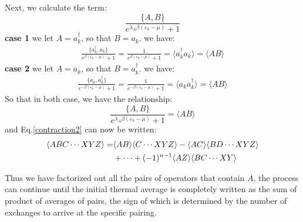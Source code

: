 \documentclass{article}
\begin{document}
Next, we calculate the term:
\begin{equation}
    \frac{\{A,B\}}{e^{\lambda_A \beta (\varepsilon_k - \mu)} + 1}
\end{equation}
\textbf{case 1} we let $A = a_k^{\dagger}$, so that $B = a_k$. we have:
\begin{align}
    \frac{\{a_k^{\dagger},a_k\}}{e^{ \beta (\varepsilon_k - \mu)} + 1} = \frac{1}{e^{\beta (\varepsilon_k - \mu)} + 1} = \langle a_k^{\dagger} a_k \rangle = \langle AB \rangle
\end{align}
\textbf{case 2} we let $A = a_k$, so that $B = a_k^{\dagger}$. we have:
\begin{align}
    \frac{\{a_k,a_k^{\dagger}\}}{e^{-\beta (\varepsilon_k - \mu)} + 1} = \frac{1}{e^{ -\beta (\varepsilon_k - \mu)} + 1} = \langle a_k a_k^{\dagger} \rangle = \langle AB \rangle
\end{align}
So that in both case, we have the relationship:
\begin{equation}
    \frac{\{A,B\}}{e^{\lambda_A \beta (\varepsilon_k - \mu)} + 1} = \langle AB \rangle
\end{equation}
and Eq.\ref{contraction2} can now be written:
\begin{align}
    \langle ABC \cdots XYZ  \rangle = & \langle AB  \rangle \langle  C \cdots XYZ \rangle  - \langle AC\rangle  \langle BD \cdots XYZ  \rangle  \notag \\
                                                & + \cdots + (-1)^{n-1} \langle AZ\rangle  \langle BC \cdots XY  \rangle \label{wick1}
\end{align}

Thus we have factorized out all the pairs of operators that contain $A$, the process can continue until the initial thermal average is completely written
as the sum of product of averages of pairs, the sign of which is determined by the number of exchanges to arrive at the specific pairing.
\end{document}
